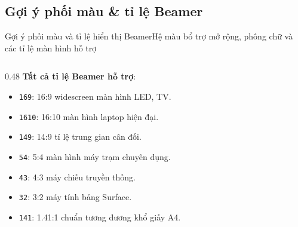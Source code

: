 \documentclass[aspectratio=169,10pt]{beamer}
\begin{document}
\subsection{Gợi ý phối màu \& tỉ lệ Beamer}
\begin{frame}{Gợi ý phối màu và tỉ lệ hiển thị Beamer}{Hệ màu bổ trợ mở rộng, phông chữ và các tỉ lệ màn hình hỗ trợ}
  \small
  \begin{columns}[T]

    \begin{column}{0.48\textwidth}
      \textbf{Tất cả tỉ lệ Beamer hỗ trợ}:
      \begin{itemize}\setlength{\itemsep}{1pt}
        \item \texttt{169}: 16:9 widescreen màn hình LED, TV.
        \item \texttt{1610}: 16:10 màn hình laptop hiện đại.
        \item \texttt{149}: 14:9 tỉ lệ trung gian cân đối.
        \item \texttt{54}: 5:4 màn hình máy trạm chuyên dụng.
        \item \texttt{43}: 4:3 máy chiếu truyền thống.
        \item \texttt{32}: 3:2 máy tính bảng Surface.
        \item \texttt{141}: 1.41:1 chuẩn tương đương khổ giấy A4.
      \end{itemize}
    \end{column}
  \end{columns}
\end{frame}
\end{document}
